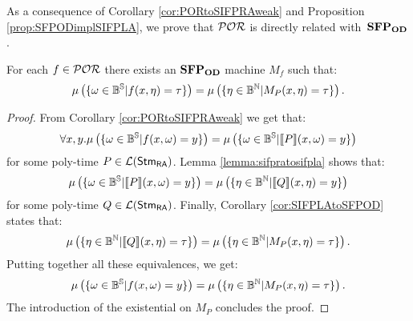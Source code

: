 \noindent
As a consequence of Corollary \ref{cor:PORtoSIFPRAweak} and
Proposition \ref{prop:SFPODimplSIFPLA},
we prove that $\mathcal{POR}$ is directly related with~$\mathbf{SFP_{\mathbf{OD}}}$.

\begin{cor}
  For each $f\in \mathcal{POR}$ there exists an $\mathbf{SFP_{\mathbf{OD}}}$ machine $M_f$
  such that:
  $$
  \mu\left(\{\omega \in \mathbb{B}^{\mathbb{S}}| f (x, \eta)= \tau\}\right)
  =
    \mu\left(\{\eta \in \mathbb{B}^{\mathbb{N}}| M_P(x, \eta)= \tau\}\right).
  $$
\end{cor}
\begin{proof}
  From Corollary \ref{cor:PORtoSIFPRAweak}
  we get that:
  $$
  \forall x, y.
  \mu\left(\{\omega \in \mathbb{B}^{\mathbb{S}}| f(x, \omega)=y\}\right)=
  \mu\left(\{\omega \in \mathbb{B}^{\mathbb{S}}| \llbracket P\rrbracket (x, \omega)=y\}\right)
  $$
  for some poly-time $P \in {\mathcal L ({\mathsf{Stm}_{\mathsf{RA}}})}$. Lemma \ref{lemma:sifpratosifpla}
  shows that:
  $$
  \mu\left(\{\omega \in \mathbb{B}^{\mathbb{S}}| \llbracket P\rrbracket (x, \omega)= y\}\right)=
  \mu\left(\{\eta \in \mathbb{B}^{\mathbb{N}}| \llbracket Q \rrbracket(x, \eta)= y\}\right)
  $$
  for some poly-time $Q \in {\mathcal L ({\mathsf{Stm}_{\mathsf{RA}}})}$. Finally, Corollary \ref{cor:SIFPLAtoSFPOD}
  states that:
  $$
  \mu\left(\{\eta \in \mathbb{B}^{\mathbb{N}}| \llbracket Q\rrbracket (x, \eta)= \tau\}\right)
  =
    \mu\left(\{\eta \in \mathbb{B}^{\mathbb{N}}|  M_P(x, \eta)= \tau\}\right).
  $$
  Putting together all these equivalences, we get:
  $$
    \mu\left(\{\omega \in \mathbb{B}^{\mathbb{S}}| f(x, \omega)=y\}\right)=\mu\left(\{\eta \in \mathbb{B}^{\mathbb{N}}|  M_P(x, \eta)= \tau\}\right).
  $$
  The introduction of the existential on $M_P$ concludes the proof.

\end{proof}























































